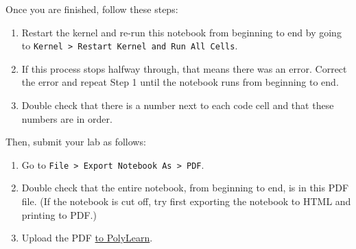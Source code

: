\documentclass[11pt]{article}
\providecommand{\tightlist}{%
      \setlength{\itemsep}{0pt}\setlength{\parskip}{0pt}}
\begin{document}
Once you are finished, follow these steps:

\begin{enumerate}
\def\labelenumi{\arabic{enumi}.}
\tightlist
\item
  Restart the kernel and re-run this notebook from beginning to end by
  going to
  \texttt{Kernel\ \textgreater{}\ Restart\ Kernel\ and\ Run\ All\ Cells}.
\item
  If this process stops halfway through, that means there was an error.
  Correct the error and repeat Step 1 until the notebook runs from
  beginning to end.
\item
  Double check that there is a number next to each code cell and that
  these numbers are in order.
\end{enumerate}

Then, submit your lab as follows:

\begin{enumerate}
\def\labelenumi{\arabic{enumi}.}
\tightlist
\item
  Go to
  \texttt{File\ \textgreater{}\ Export\ Notebook\ As\ \textgreater{}\ PDF}.
\item
  Double check that the entire notebook, from beginning to end, is in
  this PDF file. (If the notebook is cut off, try first exporting the
  notebook to HTML and printing to PDF.)
\item
  Upload the PDF
  \href{https://polylearn.calpoly.edu/AY_2018-2019/mod/assign/view.php?id=349486}{to
  PolyLearn}.
\end{enumerate}


    
    
    
    
\end{document}
